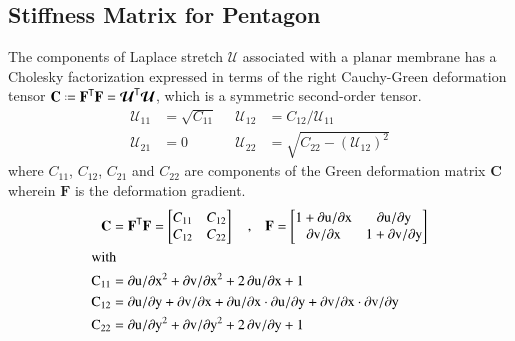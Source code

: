 \subsection{Stiffness Matrix for Pentagon}
The components of Laplace stretch $\boldsymbol{\mathcal{U}}$ associated with a planar membrane has a  Cholesky factorization expressed in terms of the right Cauchy-Green deformation tensor $\mathbf{C} \defeq \mathbf{F}^{\mathsf{T}} \mathbf{F} = \boldsymbol{\mathcal{U}}^{\mathsf{T}} \boldsymbol{\mathcal{U}}$, which is a symmetric second-order tensor. 
\begin{equation}
\begin{aligned}
{\mathcal{U}}_{11} & = \sqrt{C_{11}} \;\; & 
{\mathcal{U}}_{12} & = C_{12} / {\mathcal{U}_{11}} \\
{\mathcal{U}}_{21} & = 0 &
{\mathcal{U}}_{22} & = \sqrt{C_{22} - ({\mathcal{U}}_{12})^2} 
\end{aligned}
\label{Laplace stretchComponents}
\end{equation} 
where ${C_{11}}$, ${C_{12}}$, ${C_{21}}$ and ${C_{22}}$ are components of the Green deformation matrix $\mathbf{C}$ wherein  $\mathbf{F}$ is the deformation gradient.
\begin{subequations}
	\begin{align}
	\mathbf{C} &= \mathbf{F}^{\mathsf{T}} \mathbf{F} =
	\begin{bmatrix}
	C_{11} & C_{12}  \\
	C_{12} & C_{22} 
	\end{bmatrix} \quad \textrm{,} \quad
	\mathbf{F} =  
	\begin{bmatrix}
	1+\mathrm{\partial u / \partial x} & \mathrm{\partial u / \partial y}  \\
	\mathrm{\partial v / \partial x} & 1+\mathrm{\partial v / \partial y}
	\end{bmatrix}\\
	\intertext{with}
	\mathrm{C_{11}}&= \mathrm{\partial u / \partial x}^2+ {\mathrm{\partial v / \partial x}}^2 + 2\, \mathrm{\partial u / \partial x}  + 1\\
	\mathrm{C_{12}}&= \mathrm{\partial u / \partial y} + \mathrm{\partial v / \partial x} + \mathrm{\partial u / \partial x} \cdot \mathrm{\partial u / \partial y} + \mathrm{\partial v / \partial x} \cdot \mathrm{\partial v / \partial y}\\
	\mathrm{C_{22}}&= \mathrm{\partial u / \partial y}^2 + {\mathrm{\partial v / \partial y}}^2 + 2\, \mathrm{\partial v / \partial y} + 1
	\end{align}
\end{subequations}

